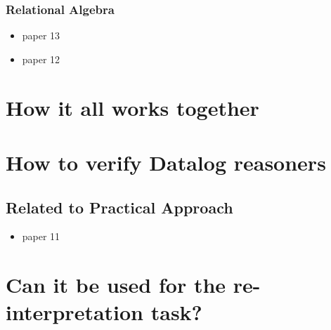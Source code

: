 \documentclass[]{article}
\begin{document}
\subsubsection{Relational Algebra}
    \begin{itemize}
	\item paper 13
	\item paper 12
    \end{itemize}

\section{How it all works together}

\section{How to verify Datalog reasoners}
\subsection{Related to Practical Approach}
    \begin{itemize}
	\item paper 11
    \end{itemize}


\section{Can it be used for the re-interpretation task?}
\end{document}
